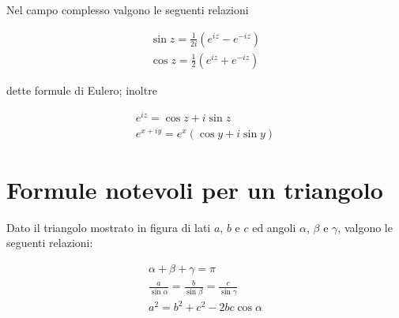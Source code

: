 Nel campo complesso valgono le seguenti relazioni

\begin{equation*}
	\begin{array}{ c }
		\sin z=\frac{1}{2i}\left( e^{iz} -e^{-iz}\right)\\
		[4mm]
		\cos z=\frac{1}{2}\left( e^{iz} +e^{-iz}\right)
	\end{array}
\end{equation*}

dette formule di Eulero; inoltre

\begin{equation*}
	\begin{array}{ c }
		e^{iz} =\cos z+i\sin z\\
		[4mm]
		e^{x+iy} =e^x(\cos y+i\sin y)
	\end{array}
\end{equation*}

\section*{Formule notevoli per un triangolo}

Dato il triangolo mostrato in figura di lati $\displaystyle a$, $\displaystyle b$ e $\displaystyle c$ ed angoli $\displaystyle \alpha$, $\displaystyle \beta $ e $\displaystyle \gamma$, valgono le seguenti relazioni:

\begin{equation*}
	\begin{array}{ c }
		\alpha +\beta +\gamma =\pi \\
		[4mm]
		\frac{a}{\sin \alpha } =\frac{b}{\sin \beta } =\frac{c}{\sin \gamma }\\
		[4mm]
		a^2 =b^2 +c^2 -2bc\cos \alpha
	\end{array}
\end{equation*}

